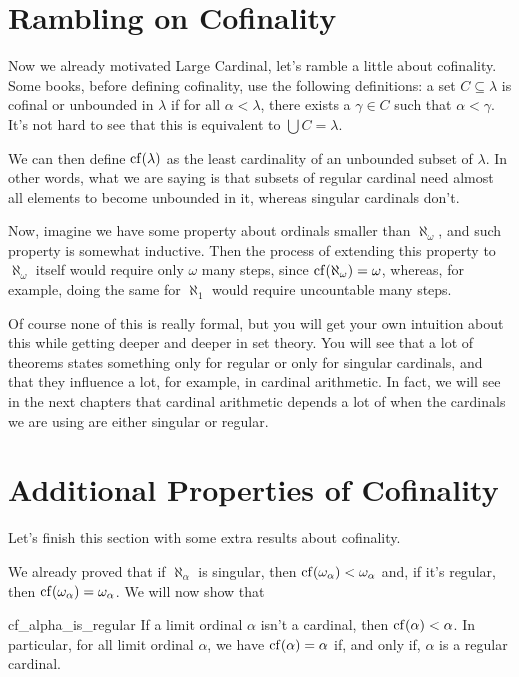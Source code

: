 \section{Rambling on Cofinality}\label{sec:ramb_cof}

Now we already motivated Large Cardinal, let's ramble a little about cofinality. Some books, before defining cofinality, use the following definitions: a set $C\subseteq\lambda$ is cofinal or unbounded in $\lambda$ if for all $\alpha<\lambda$, there exists a $\gamma\in C$ such that $\alpha<\gamma$. It's not hard to see that this is equivalent to $\bigcup C=\lambda$.

We can then define $\mathrm{cf}\!\left(\lambda\right)$ as the least cardinality of an unbounded subset of $\lambda$. In other words, what we are saying is that subsets of regular cardinal need almost all elements to become unbounded in it, whereas singular cardinals don't.

Now, imagine we have some property about ordinals smaller than $\aleph_\omega$, and such property is somewhat inductive. Then the process of extending this property to $\aleph_\omega$ itself would require only $\omega$ many steps, since $\mathrm{cf}\!\left(\aleph_\omega\right)=\omega$, whereas, for example, doing the same for $\aleph_1$ would require uncountable many steps.

Of course none of this is really formal, but you will get your own intuition about this while getting deeper and deeper in set theory. You will see that a lot of theorems states something only for regular or only for singular cardinals, and that they influence a lot, for example, in cardinal arithmetic. In fact, we will see in the next chapters that cardinal arithmetic depends a lot of when the cardinals we are using are either singular or regular.

\section{Additional Properties of Cofinality}

Let's finish this section with some extra results about cofinality.

We already proved that if $\aleph_\alpha$ is singular, then $\mathrm{cf}\!\left(\omega_\alpha\right)<\omega_\alpha$ and, if it's regular, then $\mathrm{cf}\!\left(\omega_\alpha\right)=\omega_\alpha$. We will now show that

\begin{lemma}{}{cf_alpha_is_regular}
    If a limit ordinal $\alpha$ isn't a cardinal, then $\mathrm{cf}\!\left(\alpha\right)<\alpha$. In particular, for all limit ordinal $\alpha$, we have $\mathrm{cf}\!\left(\alpha\right)=\alpha$ if, and only if, $\alpha$ is a regular cardinal.
\end{lemma}


